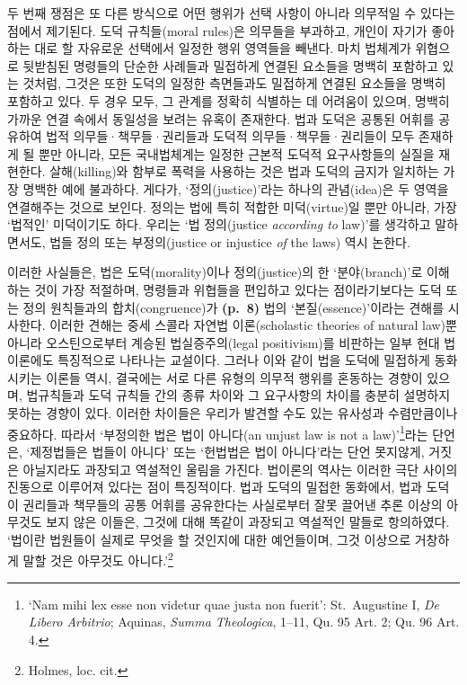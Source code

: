 두 번째 쟁점은 또 다른 방식으로 어떤 행위가 선택 사항이 아니라 의무적일
수 있다는 점에서 제기된다. 도덕 규칙들(moral rules)은 의무들을 부과하고,
개인이 자기가 좋아하는 대로 할 자유로운 선택에서 일정한 행위 영역들을
빼낸다. 마치 법체계가 위협으로 뒷받침된 명령들의 단순한 사례들과
밀접하게 연결된 요소들을 명백히 포함하고 있는 것처럼, 그것은 또한 도덕의
일정한 측면들과도 밀접하게 연결된 요소들을 명백히 포함하고 있다. 두 경우
모두, 그 관계를 정확히 식별하는 데 어려움이 있으며, 명백히 가까운 연결
속에서 동일성을 보려는 유혹이 존재한다. 법과 도덕은 공통된 어휘를
공유하여 법적 의무들·책무들·권리들과 도덕적 의무들·책무들·권리들이 모두
존재하게 될 뿐만 아니라, 모든 국내법체계는 일정한 근본적 도덕적
요구사항들의 실질을 재현한다. 살해(killing)와 함부로 폭력을 사용하는
것은 법과 도덕의 금지가 일치하는 가장 명백한 예에 불과하다. 게다가,
‘정의(justice)’라는 하나의 관념(idea)은 두 영역을 연결해주는 것으로
보인다. 정의는 법에 특히 적합한 미덕(virtue)일 뿐만 아니라, 가장
‘법적인’ 미덕이기도 하다. 우리는 ‘법 정의(justice
\emph{according to} law)’를 생각하고 말하면서도, 법들 정의 또는
부정의(justice or injustice \emph{of} the laws) 역시 논한다.

이러한 사실들은, 법은 도덕(morality)이나 정의(justice)의 한
‘분야(branch)’로 이해하는 것이 가장 적절하며, 명령들과 위협들을 편입하고
있다는 점이라기보다는 도덕 또는 정의 원칙들과의 합치(congruence)가
\textbf{(p.~8)} 법의 ‘본질(essence)’이라는 견해를 시사한다. 이러한
견해는 중세 스콜라 자연법 이론(scholastic theories of natural law)뿐
아니라 오스틴으로부터 계승된 법실증주의(legal positivism)를 비판하는
일부 현대 법이론에도 특징적으로 나타나는 교설이다. 그러나 이와 같이 법을
도덕에 밀접하게 동화시키는 이론들 역시, 결국에는 서로 다른 유형의 의무적
행위를 혼동하는 경향이 있으며, 법규칙들과 도덕 규칙들 간의 종류 차이와
그 요구사항의 차이를 충분히 설명하지 못하는 경향이 있다. 이러한 차이들은
우리가 발견할 수도 있는 유사성과 수렴만큼이나 중요하다. 따라서 ‘부정의한
법은 법이 아니다(an unjust law is not a law)’\footnote{`Nam mihi lex
  esse non videtur quae justa non fuerit': St.~Augustine I, \emph{De
  Libero Arbitrio}; Aquinas, \emph{Summa Theologica}, 1--11, Qu. 95 Art.
  2; Qu. 96 Art. 4.}라는 단언은, ‘제정법들은 법들이 아니다’ 또는
‘헌법법은 법이 아니다’라는 단언 못지않게, 거짓은 아닐지라도 과장되고
역설적인 울림을 가진다. 법이론의 역사는 이러한 극단 사이의 진동으로
이루어져 있다는 점이 특징적이다. 법과 도덕의 밀접한 동화에서, 법과
도덕이 권리들과 책무들의 공통 어휘를 공유한다는 사실로부터 잘못 끌어낸
추론 이상의 아무것도 보지 않은 이들은, 그것에 대해 똑같이 과장되고
역설적인 말들로 항의하였다. ‘법이란 법원들이 실제로 무엇을 할 것인지에
대한 예언들이며, 그것 이상으로 거창하게 말할 것은 아무것도
아니다.’\footnote{Holmes, loc. cit.}

